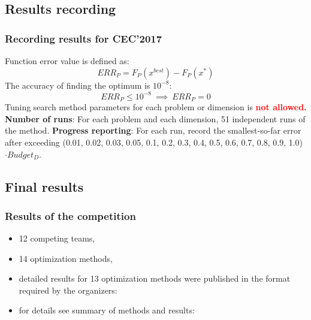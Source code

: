 \documentclass[hyperref={pdfpagelabels=false}]{beamer}
\begin{document}
\subsection{Results recording}
\begin{frame}
\frametitle{Recording results for CEC'2017} 
Function error value is defined as:
\begin{equation*}
  ERR_P = F_P(x^{best})- F_P(x^*)
\end{equation*}
The accuracy of finding the optimum is $10^{-8}$:
\begin{equation*}
 ERR_P \leq 10^{-8} \ \implies \ ERR_P = 0
\end{equation*}
Tuning search method parameters for each problem or dimension is \textcolor{red}{\textbf{not allowed.}}
\newline \newline 
\textbf{Number of runs}: For each problem and each dimension, 51 independent runs of the method. 
\newline
\newline \textbf{Progress reporting}: For each run, record the smallest-so-far error after exceeding (0.01, 0.02, 0.03, 0.05, 0.1, 0.2, 0.3, 0.4, 0.5, 0.6, 0.7, 0.8, 0.9, 1.0)$\cdot Budget_D$.
\end{frame}

\begin{frame}
\subsection{Final results}
\frametitle{Results of the competition} 
\begin{itemize}
  \item 12 competing teams,
  \item 14 optimization methods,
  \item detailed results for 13 optimization methods were published in the format required by the organizers: \href{http://web.mysites.ntu.edu.sg/epnsugan/PublicSite/Shared\%20Documents/CEC-2017/Bound-Constrained/Results\%20for\%20all\%20papers.rar}{}
  \item for details see summary of methods and results: \href{http://web.mysites.ntu.edu.sg/epnsugan/PublicSite/Shared\%20Documents/CEC-2017/Bound-Constrained/CEC\%202017\%20Special\%20Session-\%20CEC\%202017\%20benchmark-V2\%20(2).pdf}{}
\end{itemize}

\end{frame}
\end{document}
